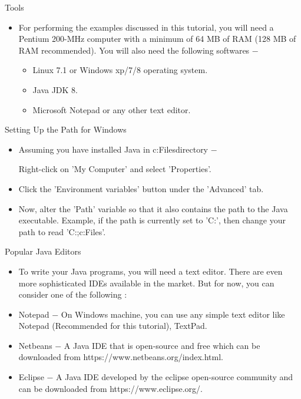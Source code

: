 \documentclass{beamer}
\begin{document}
\begin{frame}{Tools}
	\begin{itemize}
	\item 	For performing the examples discussed in this tutorial, you will need a Pentium 200-MHz computer with a minimum of 64 MB of RAM (128 MB of RAM recommended).
You will also need the following softwares −

\begin{itemize}
\item       Linux 7.1 or Windows xp/7/8 operating system.
\item       Java JDK 8.
\item       Microsoft Notepad or any other text editor.
\end{itemize}

	\end{itemize}
\end{frame}


\begin{frame}{Setting Up the Path for Windows}
	\begin{itemize}
	\item 	
	Assuming you have installed Java in c:\Program Files\java\jdk directory −

Right-click on 'My Computer' and select 'Properties'.

\item Click the 'Environment variables' button under the 'Advanced' tab.

\item Now, alter the 'Path' variable so that it also contains the path to the Java executable. Example, if the path is currently set to 'C:\WINDOWS{}', then change your path to read 'C:\WINDOWS{};c:\Program Files\java\jdk\bin'.

	\end{itemize}
\end{frame}


\begin{frame}{Popular Java Editors}
	\begin{itemize}
	\item To write your Java programs, you will need a text editor. There are even more sophisticated IDEs available in the market. But for now, you can consider one of the following :	

\item Notepad − On Windows machine, you can use any simple text editor like Notepad (Recommended for this tutorial), TextPad.
\item Netbeans − A Java IDE that is open-source and free which can be downloaded from https://www.netbeans.org/index.html.
\item Eclipse − A Java IDE developed by the eclipse open-source community and can be downloaded from https://www.eclipse.org/.
		    
	\end{itemize}
\end{frame}
\end{document}
